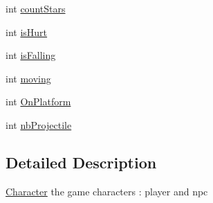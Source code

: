 \begin{DoxyCompactItemize}
\item 
int \hyperlink{struct_character_ad5865bf5f782961efc238cd4a84a445d}{count\-Stars}
\item 
int \hyperlink{struct_character_a707f2ed2ff6b487daef553437fe9751d}{is\-Hurt}
\item 
int \hyperlink{struct_character_a1f82fe73359859bfa39df1d66d6e652a}{is\-Falling}
\item 
int \hyperlink{struct_character_ad892143587536d5edaac114b6d9b38f6}{moving}
\item 
int \hyperlink{struct_character_a6aa1000eea413726c603222d5d30fdfe}{On\-Platform}
\item 
int \hyperlink{struct_character_a803fd7edf0558a9e0dc73e6351ad85d0}{nb\-Projectile}
\end{DoxyCompactItemize}


\subsection{Detailed Description}
\hyperlink{struct_character}{Character} the game characters \-: player and npc 

